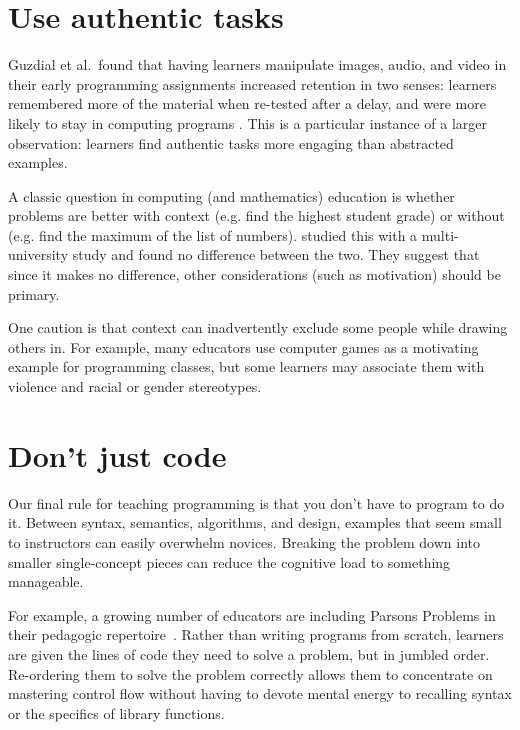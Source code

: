 \documentclass{article}
\begin{document}
\section{Use authentic tasks}\label{authentic-tasks}

Guzdial et al.\ found that having learners manipulate images, audio, and video
in their early programming assignments
increased retention in two senses:
learners remembered more of the material when re-tested after a delay,
and were more likely to stay in computing programs \cite{guzdial-media}.
This is a particular instance of a larger observation:
learners find authentic tasks more engaging than abstracted examples.

A classic question in computing (and mathematics) education is whether problems are better 
with context (e.g. find the highest student grade) or without (e.g. find the maximum of the list of numbers).
\citet{bouvier-context} studied this with a multi-university study and found no difference between
the two.  They suggest that since it makes no difference, other considerations (such as motivation)
should be primary.

One caution is that context can inadvertently exclude some people while drawing others in.
For example,
many educators use computer games as a motivating example for programming classes,
but some learners may associate them with violence and racial or gender stereotypes.

\section{Don't just code}\label{not-just-code}

Our final rule for teaching programming is that you don't have to program to do it.
Between syntax, semantics, algorithms, and design,
examples that seem small to instructors can easily overwhelm novices.
Breaking the problem down into smaller single-concept pieces can reduce the cognitive load to something manageable.

For example,
a growing number of educators are including Parsons Problems in their pedagogic repertoire~\citep{parsons,morrison-parsons}.
Rather than writing programs from scratch,
learners are given the lines of code they need to solve a problem,
but in jumbled order.
Re-ordering them to solve the problem correctly allows them to concentrate on mastering control flow
without having to devote mental energy to recalling syntax
or the specifics of library functions.
\end{document}
